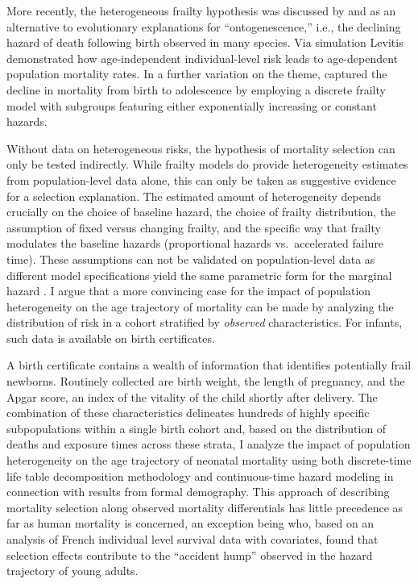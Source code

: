 \documentclass[10pt,twoside,reqno]{article}
\begin{document}
More recently, the heterogeneous frailty hypothesis was discussed by \citet{Levitis2011} and \citet{Levitis2013} as an alternative to evolutionary explanations for ``ontogenescence,'' i.e., the declining hazard of death following birth observed in many species. Via simulation Levitis demonstrated how age-independent individual-level risk leads to age-dependent population mortality rates. In a further variation on the theme, \citet{Avraam2014} captured the decline in mortality from birth to adolescence by employing a discrete frailty model with subgroups featuring either exponentially increasing or constant hazards.

Without data on heterogeneous risks, the hypothesis of mortality selection can only be tested indirectly. While frailty models do provide heterogeneity estimates from population-level data alone, this can only be taken as suggestive evidence for a selection explanation. The estimated amount of heterogeneity depends crucially on the choice of baseline hazard, the choice of frailty distribution, the assumption of fixed versus changing frailty, and the specific way that frailty modulates the baseline hazards (proportional hazards vs.~accelerated failure time). These assumptions can not be validated on population-level data as different model specifications yield the same parametric form for the marginal hazard \citep{Trussell1985, Hoem1990, Yashin2000}. I argue that a more convincing case for the impact of population heterogeneity on the age trajectory of mortality can be made by analyzing the distribution of risk in a cohort stratified by \emph{observed} characteristics. For infants, such data is available on birth certificates.

A birth certificate contains a wealth of information that identifies potentially frail newborns. Routinely collected are birth weight, the length of pregnancy, and the Apgar score, an index of the vitality of the child shortly after delivery. The combination of these characteristics delineates hundreds of highly specific subpopulations within a single birth cohort and, based on the distribution of deaths and exposure times across these strata, I analyze the impact of population heterogeneity on the age trajectory of neonatal mortality using both discrete-time life table decomposition methodology and continuous-time hazard modeling in connection with results from formal demography. This approach of describing mortality selection along observed mortality differentials has little precedence as far as human mortality is concerned, an exception being \citet{Remund2015} who, based on an analysis of French individual level survival data with covariates, found that selection effects contribute to the ``accident hump'' observed in the hazard trajectory of young adults.
\end{document}
